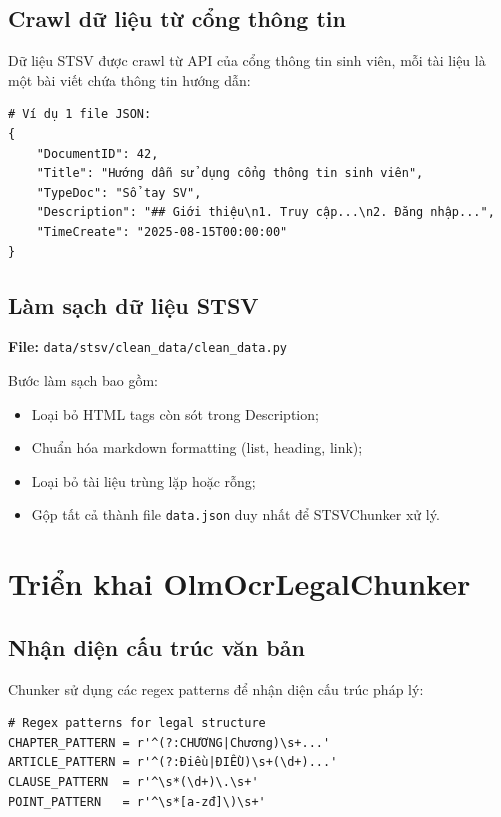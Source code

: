 \documentclass[../DoAn.tex]{subfiles}
\begin{document}
\subsection{Crawl dữ liệu từ cổng thông tin}
Dữ liệu STSV được crawl từ API của cổng thông tin sinh viên, mỗi tài liệu là một bài viết chứa thông tin hướng dẫn:
\begin{verbatim}
# Ví dụ 1 file JSON:
{
    "DocumentID": 42,
    "Title": "Hướng dẫn sử dụng cổng thông tin sinh viên",
    "TypeDoc": "Sổ tay SV",
    "Description": "## Giới thiệu\n1. Truy cập...\n2. Đăng nhập...",
    "TimeCreate": "2025-08-15T00:00:00"
}
\end{verbatim}

\subsection{Làm sạch dữ liệu STSV}
\textbf{File:} \texttt{data/stsv/clean\_data/clean\_data.py}

Bước làm sạch bao gồm:
\begin{itemize}
    \item Loại bỏ HTML tags còn sót trong Description;
    \item Chuẩn hóa markdown formatting (list, heading, link);
    \item Loại bỏ tài liệu trùng lặp hoặc rỗng;
    \item Gộp tất cả thành file \texttt{data.json} duy nhất để STSVChunker xử lý.
\end{itemize}

\section{Triển khai OlmOcrLegalChunker}

\subsection{Nhận diện cấu trúc văn bản}
Chunker sử dụng các regex patterns để nhận diện cấu trúc pháp lý:
\begin{verbatim}
# Regex patterns for legal structure
CHAPTER_PATTERN = r'^(?:CHƯƠNG|Chương)\s+...'
ARTICLE_PATTERN = r'^(?:Điều|ĐIỀU)\s+(\d+)...'
CLAUSE_PATTERN  = r'^\s*(\d+)\.\s+'
POINT_PATTERN   = r'^\s*[a-zđ]\)\s+'
\end{verbatim}
\end{document}
